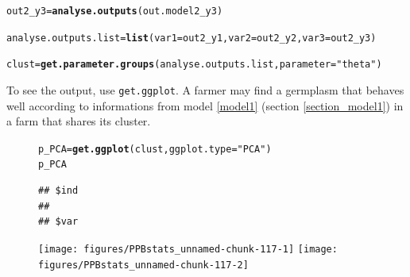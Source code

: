 \documentclass{article}\usepackage[]{graphicx}\usepackage[]{color}
\makeatletter
\newcommand{\hlstr}[1]{\textcolor[rgb]{0.192,0.494,0.8}{#1}}%
\newcommand{\hlstd}[1]{\textcolor[rgb]{0.345,0.345,0.345}{#1}}%
\newcommand{\hlkwb}[1]{\textcolor[rgb]{0.69,0.353,0.396}{#1}}%
\newcommand{\hlkwc}[1]{\textcolor[rgb]{0.333,0.667,0.333}{#1}}%
\newcommand{\hlkwd}[1]{\textcolor[rgb]{0.737,0.353,0.396}{\textbf{#1}}}%
\newenvironment{kframe}{%
 \def\at@end@of@kframe{}%
 \ifinner\ifhmode%
  \def\at@end@of@kframe{\end{minipage}}%
  \begin{minipage}{\columnwidth}%
 \fi\fi%
 \def\FrameCommand##1{\hskip\@totalleftmargin \hskip-\fboxsep
 \colorbox{shadecolor}{##1}\hskip-\fboxsep
     \hskip-\linewidth \hskip-\@totalleftmargin \hskip\columnwidth}%
 \MakeFramed {\advance\hsize-\width
   \@totalleftmargin\z@ \linewidth\hsize
   \@setminipage}}%
 {\par\unskip\endMakeFramed%
 \at@end@of@kframe}
\newenvironment{knitrout}{}{} %
\makeatother
\begin{document}
\begin{knitrout}
\begin{kframe}
{\ttfamily\noindent\itshape\color{messagecolor}{\#\# The beta\_i posterior distributions are done.}}

{\ttfamily\noindent\itshape\color{messagecolor}{\#\# The theta\_j posterior distributions are done.}}\begin{alltt}
\hlstd{out2_y3} \hlkwb{=} \hlkwd{analyse.outputs}\hlstd{(out.model2_y3)}
\end{alltt}


{\ttfamily\noindent\itshape\color{messagecolor}{\#\# The experimental design plot is done.}}

{\ttfamily\noindent\itshape\color{messagecolor}{\#\# The Gelman-Rubin test is running for each parameter ...}}

{\ttfamily\noindent\itshape\color{messagecolor}{\#\# The two MCMC for each parameter converge thanks to the Gelman-Rubin test.}}

{\ttfamily\noindent\itshape\color{messagecolor}{\#\# The alpha\_i posterior distributions are done.}}

{\ttfamily\noindent\itshape\color{messagecolor}{\#\# The beta\_i posterior distributions are done.}}

{\ttfamily\noindent\itshape\color{messagecolor}{\#\# The theta\_j posterior distributions are done.}}\begin{alltt}
\hlstd{analyse.outputs.list} \hlkwb{=} \hlkwd{list}\hlstd{(}\hlkwc{var1} \hlstd{= out2_y1,} \hlkwc{var2} \hlstd{= out2_y2,} \hlkwc{var3} \hlstd{= out2_y3)}

\hlstd{clust} \hlkwb{=} \hlkwd{get.parameter.groups}\hlstd{(analyse.outputs.list,} \hlkwc{parameter} \hlstd{=} \hlstr{"theta"}\hlstd{)}
\end{alltt}
\end{kframe}
\end{knitrout}

To see the output, use \texttt{get.ggplot}.
A farmer may find a germplasm that behaves well according to informations from model \ref{model1} (section \ref{section_model1}) in a farm that shares its cluster.

\begin{figure}[H]
\begin{knitrout}
\color{fgcolor}\begin{kframe}
\begin{alltt}
\hlstd{p_PCA} \hlkwb{=} \hlkwd{get.ggplot}\hlstd{(clust,} \hlkwc{ggplot.type} \hlstd{=} \hlstr{"PCA"}\hlstd{)}
\hlstd{p_PCA}
\end{alltt}
\begin{verbatim}
## $ind
## 
## $var
\end{verbatim}
\end{kframe}


{\centering \texttt{[image: figures/PPBstats\_unnamed-chunk-117-1]} 
\texttt{[image: figures/PPBstats\_unnamed-chunk-117-2]} 

}



\end{knitrout}
\end{figure}
\end{document}
